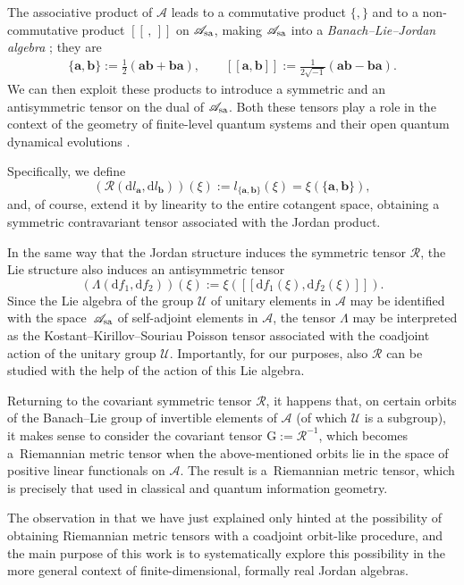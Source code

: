 \documentclass[pdftex]{sigma}
\numberwithin{equation}{section}
\newcommand{\appa}{\mathscr{A}}
\newcommand{\appas}{\mathscr{A}_{\rm sa}}
\newcommand{\G}{\mathrm{G}}
\begin{document}
The associative product of $\appa$ leads to a commutative product $\{,\}$ and to a non-commutative product $[[\,,\,]]$ on $\appas$, making $\appa_{\rm sa}$ into a \emph{Banach--Lie--Jordan algebra} \cite{A-S-2001}; they are
\begin{gather*}%
\{\mathbf{a},\mathbf{b}\} := \frac{1}{2} (\mathbf{ab} + \mathbf{ba}), \qquad
[[\mathbf{a},\mathbf{b}]] := \frac{1}{2\sqrt{-1}} (\mathbf{ab} - \mathbf{ba}).
\end{gather*}
We can then exploit these products to introduce a symmetric and an antisymmetric tensor on the dual of $\appas$.
Both these tensors play a role in the context of the geometry of finite-level quantum systems and their open quantum dynamical evolutions \cite{C-C-I-M-V-2019, C-DC-I-L-M-2017}.

Specifically, we define
\[
\left(\mathcal{R}(\mathrm{d}l_{\mathbf{a}},\mathrm{d}l_{\mathbf{b}})\right)(\xi) := l_{\{\mathbf{a},\mathbf{b}\}}(\xi) = \xi(\{\mathbf{a},\mathbf{b}\}),
\]
and, of course, extend it by linearity to the entire cotangent space, obtaining a symmetric contravariant tensor associated with the Jordan product.

In the same way that the Jordan structure induces the symmetric tensor $\mathcal{R}$, the Lie structure also induces an antisymmetric tensor
\[
\left(\Lambda(\mathrm{d}f_{1},\mathrm{d}f_{2})\right)(\xi) := \xi\left([[\mathrm{d}f_{1}(\xi), \mathrm{d}f_{2}(\xi)]]\right).
\]
Since the Lie algebra of the group $\mathscr{U}$ of unitary elements in $\appa$ may be identified with the space~$\appas$ of self-adjoint elements in $\appa$, the tensor $\Lambda$ may be interpreted as the Kostant--Kirillov--Souriau Poisson tensor associated with the coadjoint action of the unitary group $\mathscr{U}$.
Importantly, for our purposes, also $\mathcal{R}$ can be studied with the help of the action of this Lie algebra.

Returning to the covariant symmetric tensor $\mathcal{R}$, it happens that, on certain orbits of the Banach--Lie group of invertible elements of $\appa$ (of which $\mathscr{U}$ is a subgroup), it makes sense to consider the covariant tensor $\G := \mathcal{R}^{-1}$, which becomes a~Riemannian metric tensor when the above-mentioned orbits lie in the space of positive linear functionals on $\appa$. The result is a~Riemannian metric tensor, which is precisely that used in classical and quantum information geometry.

The observation in \cite{C-J-S-2020} that we have just explained only hinted at the possibility of obtaining Riemannian metric tensors with a coadjoint orbit-like procedure, and the main purpose of this work is to systematically explore this possibility in the more general context of finite-dimensional, formally real Jordan algebras.
\end{document}
